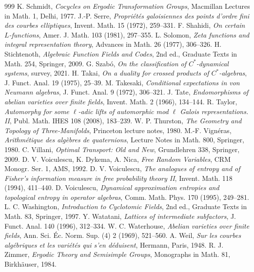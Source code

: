\begin{thebibliography}{999}
 K. Schmidt, \emph{Cocycles on Ergodic Transformation Groups}, Macmillan Lectures in Math. 1, Delhi, 1977.
 J.-P. Serre, \emph{Propri\'et\'es galoisiennes des points d'ordre fini des courbes elliptiques}, Invent. Math. 15 (1972), 259--331.
 F. Shahidi, \emph{On certain $L$-functions}, Amer. J. Math. 103 (1981), 297--355.
 L. Solomon, \emph{Zeta functions and integral representation theory}, Advances in Math. 26 (1977), 306--326.
 H. Stichtenoth, \emph{Algebraic Function Fields and Codes}, 2nd ed., Graduate Texts in Math. 254, Springer, 2009.
 G. Szab\'o, \emph{On the classification of $C^*$-dynamical systems}, survey, 2021.
 H. Takai, \emph{On a duality for crossed products of $C^*$-algebras}, J. Funct. Anal. 19 (1975), 25--39.
 M. Takesaki, \emph{Conditional expectations in von Neumann algebras}, J. Funct. Anal. 9 (1972), 306--321.
 J. Tate, \emph{Endomorphisms of abelian varieties over finite fields}, Invent. Math. 2 (1966), 134--144.
 R. Taylor, \emph{Automorphy for some $\ell$-adic lifts of automorphic mod $\ell$ Galois representations. II}, Publ. Math. IHES 108 (2008), 183--239.
 W. P. Thurston, \emph{The Geometry and Topology of Three-Manifolds}, Princeton lecture notes, 1980.
 M.-F. Vign\'eras, \emph{Arithm\'etique des alg\`ebres de quaternions}, Lecture Notes in Math. 800, Springer, 1980.
 C. Villani, \emph{Optimal Transport: Old and New}, Grundlehren 338, Springer, 2009.
 D. V. Voiculescu, K. Dykema, A. Nica, \emph{Free Random Variables}, CRM Monogr. Ser. 1, AMS, 1992.
 D. V. Voiculescu, \emph{The analogues of entropy and of Fisher's information measure in free probability theory II}, Invent. Math. 118 (1994), 411--440.
 D. Voiculescu, \emph{Dynamical approximation entropies and topological entropy in operator algebras}, Comm. Math. Phys. 170 (1995), 249--281.
 L. C. Washington, \emph{Introduction to Cyclotomic Fields}, 2nd ed., Graduate Texts in Math. 83, Springer, 1997.
 Y. Watatani, \emph{Lattices of intermediate subfactors}, J. Funct. Anal. 140 (1996), 312--334.
 W. C. Waterhouse, \emph{Abelian varieties over finite fields}, Ann. Sci. \'Ec. Norm. Sup. (4) 2 (1969), 521--560.
 A. Weil, \emph{Sur les courbes alg\'ebriques et les vari\'et\'es qui s'en d\'eduisent}, Hermann, Paris, 1948.
 R. J. Zimmer, \emph{Ergodic Theory and Semisimple Groups}, Monographs in Math. 81, Birkh\"auser, 1984.
\end{thebibliography}
